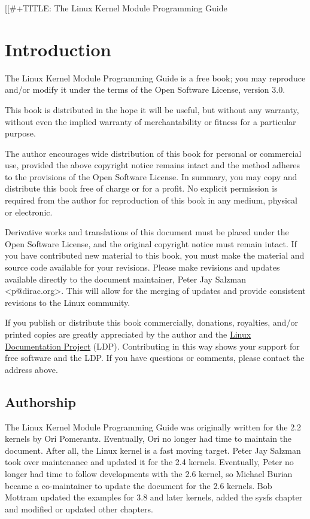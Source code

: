\documentclass[11pt]{article}
\author{Peter Jay Salzman, Michael Burian, Ori Pomerantz, Bob Mottram}
\date{\today}
\title{}
\begin{document}
\tableofcontents

[[\#+TITLE: The Linux Kernel Module Programming Guide


\section{Introduction}
\label{sec:orgf2724f4}
The Linux Kernel Module Programming Guide is a free book; you may reproduce and/or modify it under the terms of the Open Software License, version 3.0.

This book is distributed in the hope it will be useful, but without any warranty, without even the implied warranty of merchantability or fitness for a particular purpose.

The author encourages wide distribution of this book for personal or commercial use, provided the above copyright notice remains intact and the method adheres to the provisions of the Open Software License. In summary, you may copy and distribute this book free of charge or for a profit. No explicit permission is required from the author for reproduction of this book in any medium, physical or electronic.

Derivative works and translations of this document must be placed under the Open Software License, and the original copyright notice must remain intact. If you have contributed new material to this book, you must make the material and source code available for your revisions. Please make revisions and updates available directly to the document maintainer, Peter Jay Salzman <p@dirac.org>. This will allow for the merging of updates and provide consistent revisions to the Linux community.

If you publish or distribute this book commercially, donations, royalties, and/or printed copies are greatly appreciated by the author and the \href{http://www.tldp.org}{Linux Documentation Project} (LDP). Contributing in this way shows your support for free software and the LDP. If you have questions or comments, please contact the address above.

\subsection{Authorship}
\label{sec:org25fcaac}

The Linux Kernel Module Programming Guide was originally written for the 2.2 kernels by Ori Pomerantz. Eventually, Ori no longer had time to maintain the document. After all, the Linux kernel is a fast moving target. Peter Jay Salzman took over maintenance and updated it for the 2.4 kernels. Eventually, Peter no longer had time to follow developments with the 2.6 kernel, so Michael Burian became a co-maintainer to update the document for the 2.6 kernels.  Bob Mottram updated the examples for 3.8 and later kernels, added the sysfs chapter and modified or updated other chapters.
\end{document}
